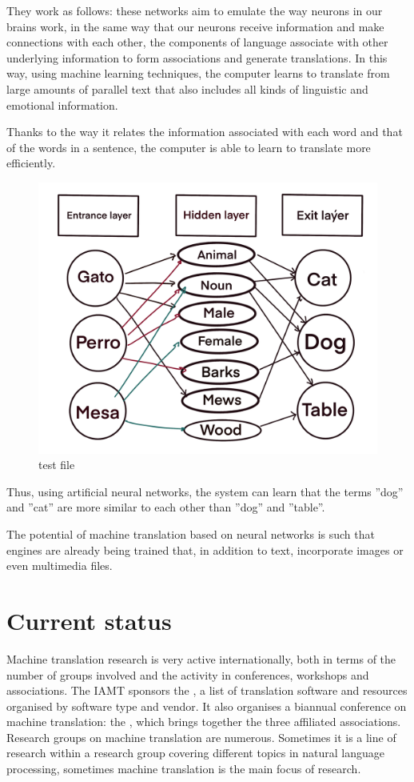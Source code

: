 \documentclass[a4paper]{article}
\theoremstyle{plain}
\theoremstyle{definition}
\begin{document}
    They work as follows: these networks aim to emulate the way neurons in our brains work, in the same way that our neurons receive information and make connections with each other, the components of language associate with other underlying information to form associations and generate translations. In this way, using machine learning techniques, the computer learns to translate from large amounts of parallel text that also includes all kinds of linguistic and emotional information.

    Thanks to the way it relates the information associated with each word and that of the words in a sentence, the computer is able to learn to translate more efficiently.
    
\begin{figure}[h]
    \centering
    \includegraphics[width=250pt\textwidth]{neuronal.PNG}
    \caption{test file}
    \label{fig:mesh1}
\end{figure}
		\newpage
	Thus, using artificial neural networks, the system can learn that the terms ''dog'' and ''cat'' are more similar to each other than ''dog'' and ''table''.

    The potential of machine translation based on neural networks is such that engines are already being trained that, in addition to text, incorporate images or even multimedia files.
	
	
	
	
	

	\section{Current status}
	Machine translation research is very active internationally, both in terms of the number of groups involved and the activity in conferences, workshops and associations. The IAMT sponsors the , a list of translation software and resources organised by software type and vendor. It also organises a biannual conference on machine translation: the , which brings together the three affiliated associations. Research groups on machine translation are numerous. Sometimes it is a line of research within a research group covering different topics in natural language processing, sometimes machine translation is the main focus of research.
\end{document}
